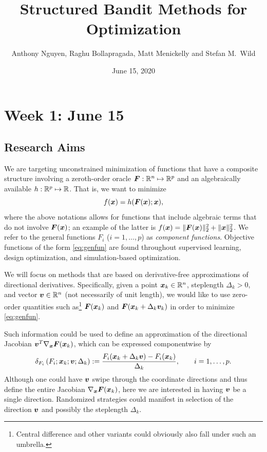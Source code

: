 \documentclass{article}
\title{Structured Bandit Methods for Optimization}
\author{Anthony Nguyen, Raghu Bollapragada, Matt Menickelly and Stefan M.\ Wild}
\date{June 15, 2020}
\begin{document}
\maketitle

\section{Week 1: June 15}


\subsection{Research Aims}
\label{sec:research}

We are targeting unconstrained minimization of functions that have a composite structure involving a zeroth-order oracle $\bm{F}:\mathbb{R}^n\mapsto \mathbb{R}^p$ and an algebraically available $h: \mathbb{R}^p\mapsto \mathbb{R}$. That is, we want to minimize
\begin{equation}
\label{eq:genfun}
f(\bm{x}) = h(\bm{F}(\bm{x}); \bm{x}),
\end{equation}
where the above notations allows for functions that include algebraic terms that do not involve $\bm{F}(\bm{x})$; an example of the latter is $f(\bm{x}) = \|\bm{F}(\bm{x})\|_2^2 + \|\bm{x}\|_2^2$. 
We refer to the general functions $F_i$ ($i=1,\ldots, p$) as \emph{component functions}.
Objective functions of the form \cref{eq:genfun} are found throughout supervised learning, design optimization, and simulation-based optimization. 

We will focus on methods that are based on derivative-free approximations of directional derivatives.
Specifically, given a point $\bm{x}_k\in \mathbb{R}^n$, steplength $\Delta_k>0$, and vector $\bm{v} \in \mathbb{R}^n$ (not necessarily of unit length), we would like to use zero-order quantities such as\footnote{Central difference and other variants could obviously also fall under such an umbrella.} $\bm{F}(\bm{x}_k)$ and $\bm{F}(\bm{x}_k+\Delta_k \bm{v}_k)$
in order to minimize \cref{eq:genfun}.

Such information could be used to define an approximation of the directional Jacobian $\bm{v}^T\nabla_{\bm{x}}\bm{F}(\bm{x}_k)$, which can be expressed componentwise by 
\begin{equation}
 \delta_{F_i}\left(F_i;\bm{x}_k;\bm{v};\Delta_k\right) := \displaystyle \frac{F_i(\bm{x}_k+\Delta_k\bm{v})-F_i(\bm{x}_k)}{\Delta_k}, \qquad i=1,\ldots, p.
 \label{eq:Fivdiff}
\end{equation}
Although one could have $\bm{v}$ swipe through the coordinate directions and thus define the entire Jacobian $\nabla_{\bm{x}}\bm{F}(\bm{x}_k)$, here we are interested in having $\bm{v}$ be a single direction. Randomized strategies could manifest in selection of the direction $\bm{v}$ and possibly the steplength $\Delta_k$. 
\end{document}
